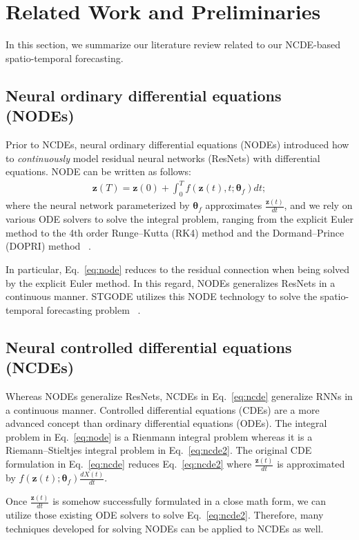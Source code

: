 \documentclass[letterpaper]{article} \usepackage{aaai22}  \usepackage{times}  \usepackage{helvet}  \usepackage{courier}  \usepackage[hyphens]{url}  \usepackage{graphicx} \urlstyle{rm} \def\UrlFont{\rm}  \usepackage{natbib}  \usepackage{caption} \DeclareCaptionStyle{ruled}{labelfont=normalfont,labelsep=colon,strut=off} \frenchspacing  \setlength{\pdfpagewidth}{8.5in}  \setlength{\pdfpageheight}{11in}  \usepackage{stfloats}
\begin{document}
\section{Related Work and Preliminaries}
In this section, we summarize our literature review related to our NCDE-based spatio-temporal forecasting.
\subsection{Neural ordinary differential equations (NODEs)}
Prior to NCDEs, neural ordinary differential equations (NODEs) introduced how to \emph{continuously} model residual neural networks (ResNets) with differential equations. NODE can be written as follows:
\begin{align}\label{eq:node}
\bm{z}(T) = \bm{z}(0) + \int_{0}^{T} f(\bm{z}(t), t;\bm{\theta}_f) dt;
\end{align}where the neural network parameterized by $\bm{\theta}_f$ approximates $\frac{\bm{z}(t)}{dt}$, and we rely on various ODE solvers to solve the integral problem, ranging from the explicit Euler method to the 4th order Runge--Kutta (RK4) method and the Dormand--Prince (DOPRI) method ~\cite{DORMAND198019}.

In particular, Eq.~\eqref{eq:node} reduces to the residual connection when being solved by the explicit Euler method. In this regard, NODEs generalizes ResNets in a continuous manner. STGODE utilizes this NODE technology to solve the spatio-temporal forecasting problem ~\cite{fang2021STODE}.

\subsection{Neural controlled differential equations (NCDEs)}
Whereas NODEs generalize ResNets, NCDEs in Eq.~\eqref{eq:ncde} generalize RNNs in a continuous manner. Controlled differential equations (CDEs) are a more advanced concept than ordinary differential equations (ODEs). The integral problem in Eq.~\eqref{eq:node} is a Rienmann integral problem whereas it is a Riemann--Stieltjes integral problem in Eq.~\eqref{eq:ncde2}. The original CDE formulation in Eq.~\eqref{eq:ncde} reduces Eq.~\eqref{eq:ncde2} where $\frac{\bm{z}(t)}{dt}$ is approximated by $f(\bm{z}(t);\bm{\theta}_f) \frac{dX(t)}{dt}$.

Once $\frac{\bm{z}(t)}{dt}$ is somehow successfully formulated in a close math form, we can utilize those existing ODE solvers to solve Eq.~\eqref{eq:ncde2}. Therefore, many techniques developed for solving NODEs can be applied to NCDEs as well.
\end{document}
